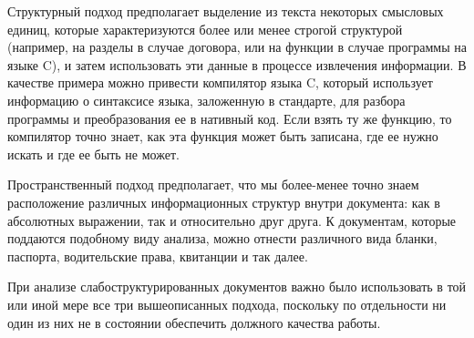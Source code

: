 Структурный подход предполагает выделение из текста некоторых смысловых единиц, которые характеризуются более или менее строгой структурой (например, на разделы в случае договора, или на функции в случае программы на языке C), и затем использовать эти данные в процессе извлечения информации. В качестве примера можно привести компилятор языка C, который использует информацию о синтаксисе языка, заложенную в стандарте, для разбора программы и преобразования ее в нативный код. Если взять ту же функцию, то компилятор точно знает, как эта функция может быть записана, где ее нужно искать и где ее быть не может.

Пространственный подход предполагает, что мы более-менее точно знаем расположение различных информационных структур внутри документа: как в абсолютных выражении, так и относительно друг друга. К документам, которые поддаются подобному виду анализа, можно отнести различного вида бланки, паспорта, водительские права, квитанции и так далее.

При анализе слабоструктурированных документов важно было использовать в той или иной мере все три вышеописанных подхода, поскольку по отдельности ни один из них не в состоянии обеспечить должного качества работы.

